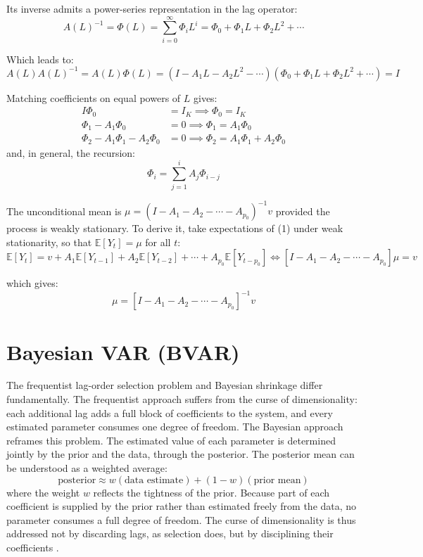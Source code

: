 \documentclass[12pt, a4paper]{article}
\begin{document}
Its inverse admits a power-series representation in the lag operator:
\begin{equation}
A(L)^{-1} = \Phi(L) = \sum_{i=0}^{\infty} \Phi_i L^{i} = \Phi_0 + \Phi_1L + \Phi_2L^2 + \cdots  
\end{equation}

Which leads to: 
\begin{equation}
A(L)A(L)^{-1} = A(L)\Phi(L) = (I - A_1L - A_2L^2 - \cdots)(\Phi_0 + \Phi_1L + \Phi_2L^2 + \cdots) = I  
\end{equation}

Matching coefficients on equal powers of $L$ gives: 
\begin{align*}
I\Phi_0 &= I_K \implies \Phi_0 = I_K \\
\Phi_1 - A_1\Phi_0 &= 0 \implies \Phi_1 = A_1\Phi_0 \\
\Phi_2 - A_1\Phi_1 - A_2\Phi_0 &= 0 \implies \Phi_2 = A_1\Phi_1 + A_2\Phi_0
\end{align*}
and, in general, the recursion: 
\begin{equation}
\Phi_i = \sum_{j=1}^{i} A_j\Phi_{i-j}  
\end{equation}

The unconditional mean is $\mu = (I-A_1-A_2-\cdots-A_{p_0})^{-1}v$ provided the process is weakly stationary. To derive it, take expectations of (1) under weak stationarity, so that $\mathbb{E}[Y_t] = \mu$ for all $t$:
\begin{equation}
\mathbb{E}[Y_t] = v + A_1\mathbb{E}[Y_{t-1}] + A_2\mathbb{E}[Y_{t-2}] + \cdots + A_{p_0}\mathbb{E}[Y_{t-p_0}] \iff [I-A_1-A_2-\cdots-A_{p_0}]\mu = v  
\end{equation}

which gives: 
\begin{equation}
\mu = [I-A_1-A_2-\cdots-A_{p_0}]^{-1}v  
\end{equation}

\section{Bayesian VAR (BVAR)}
\label{sec:BVAR}

The frequentist lag-order selection problem and Bayesian shrinkage differ fundamentally. The frequentist approach suffers from the curse of dimensionality: each additional lag adds a full block of coefficients to the system, and every estimated parameter consumes one degree of freedom. The Bayesian approach reframes this problem. The estimated value of each parameter is determined jointly by the prior and the data, through the posterior. The posterior mean can be understood as a weighted average:
\begin{equation} \label{eq:posterior_weight}
\text{posterior} \approx w(\text{data estimate}) + (1 - w)(\text{prior mean})
\end{equation}
where the weight $w$ reflects the tightness of the prior. Because part of each coefficient is supplied by the prior rather than estimated freely from the data, no parameter consumes a full degree of freedom. The curse of dimensionality is thus addressed not by discarding lags, as selection does, but by disciplining their coefficients \citep[chapt. 5]{lutkepohlNewIntroductionMultiple2005}.
\end{document}
